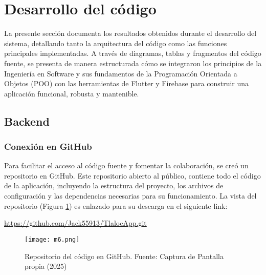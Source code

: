 




\newpage
\section{Desarrollo del código}
\label{cap_desarrollodelcodigo}
La presente sección documenta los resultados obtenidos durante el desarrollo del sistema, detallando tanto la arquitectura del código como las funciones principales implementadas. A través de diagramas, tablas y fragmentos del código fuente, se presenta de manera estructurada cómo se integraron los principios de la Ingeniería en Software y sus fundamentos de la Programación Orientada a Objetos (POO) con las herramientas de Flutter y Firebase para construir una aplicación funcional, robusta y mantenible.
\subsection{Backend}

\subsubsection{Conexión en GitHub}
Para facilitar el acceso al código fuente y fomentar la colaboración, se creó un repositorio en GitHub. Este repositorio abierto al público, contiene todo el código de la aplicación, incluyendo la estructura del proyecto, los archivos de configuración y las dependencias necesarias para su funcionamiento. La vista del repositorio (Figura \ref{m6}) es enlazado para su descarga en el siguiente link:
\begin{center}
  \url{https://github.com/Jack55913/TlalocApp.git}
\end{center}

\begin{figure}[ht]
\centering
  \texttt{[image: m6.png]}
  \caption{Repositorio del código en GitHub. Fuente: Captura de Pantalla propia (2025)}
  \label{m6}
\end{figure}






